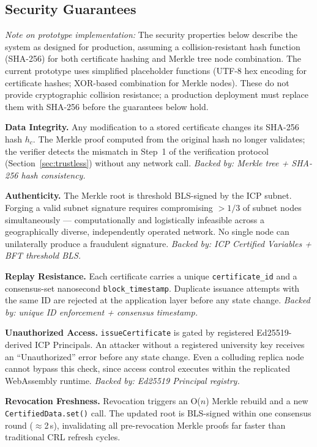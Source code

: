 \documentclass[conference,a4paper]{IEEEtran}
\begin{document}
\subsection{Security Guarantees}

\textit{Note on prototype implementation:} The security properties below describe the system as designed for production, assuming a collision-resistant hash function (SHA-256) for both certificate hashing and Merkle tree node combination. The current prototype uses simplified placeholder functions (UTF-8 hex encoding for certificate hashes; XOR-based combination for Merkle nodes). These do not provide cryptographic collision resistance; a production deployment must replace them with SHA-256 before the guarantees below hold.

\textbf{Data Integrity.} Any modification to a stored certificate changes its SHA-256 hash $h_c$. The Merkle proof computed from the original hash no longer validates; the verifier detects the mismatch in Step~1 of the verification protocol (Section~\ref{sec:trustless}) without any network call. \textit{Backed by: Merkle tree + SHA-256 hash consistency.}

\textbf{Authenticity.} The Merkle root is threshold BLS-signed by the ICP subnet. Forging a valid subnet signature requires compromising $>1/3$ of subnet nodes simultaneously — computationally and logistically infeasible across a geographically diverse, independently operated network. No single node can unilaterally produce a fraudulent signature. \textit{Backed by: ICP Certified Variables + BFT threshold BLS.}

\textbf{Replay Resistance.} Each certificate carries a unique \texttt{certificate\_id} and a consensus-set nanosecond \texttt{block\_timestamp}. Duplicate issuance attempts with the same ID are rejected at the application layer before any state change. \textit{Backed by: unique ID enforcement + consensus timestamp.}

\textbf{Unauthorized Access.} \texttt{issueCertificate} is gated by registered Ed25519-derived ICP Principals. An attacker without a registered university key receives an ``Unauthorized'' error before any state change. Even a colluding replica node cannot bypass this check, since access control executes within the replicated WebAssembly runtime. \textit{Backed by: Ed25519 Principal registry.}

\textbf{Revocation Freshness.} Revocation triggers an O($n$) Merkle rebuild and a new \texttt{CertifiedData.set()} call. The updated root is BLS-signed within one consensus round ($\approx$2\,s), invalidating all pre-revocation Merkle proofs far faster than traditional CRL refresh cycles.
\end{document}
